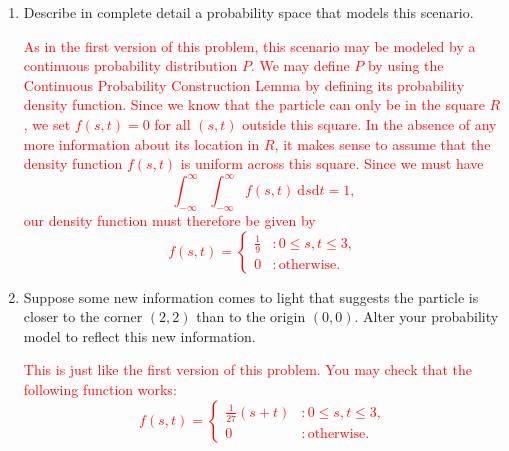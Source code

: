 \documentclass[12pt,reqno]{amsart}
\begin{document}
\medskip
\begin{enumerate}
    \item Describe in complete detail a probability space that models this scenario.

    \bigskip
    \textcolor{red}{As in the first version of this problem, this scenario may be modeled by a continuous probability distribution $P$. We may define $P$ by using the Continuous Probability Construction Lemma by defining its probability density function. Since we know that the particle can only be in the square $R$, we set $f(s,t)=0$ for all $(s,t)$ outside this square. In the absence of any more information about its location in $R$, it makes sense to assume that the density function $f(s,t)$ is uniform across this square. Since we must have
        \[\int_{-\infty}^\infty \int_{-\infty}^\infty f(s,t) \ \text{d} s \text{d}t =1,\]
    our density function must therefore be given by
        \[f(s,t) = \begin{cases} \frac{1}{9} & : 0 \leq s,t \leq 3, \\ 0 & : \text{otherwise}.\end{cases}\]}
    \bigskip

    \item Suppose some new information comes to light that suggests the particle is closer to the corner $(2,2)$ than to the origin $(0,0)$. Alter your probability model to reflect this new information.
    
    \bigskip
    \textcolor{red}{This is just like the first version of this problem. You may check that the following function works:
        \[f(s,t) = \begin{cases}
            \frac{1}{27}(s+t) & : 0 \leq s,t \leq 3, \\
            0 & : \text{otherwise}.
        \end{cases}\]}
\end{enumerate}
\end{document}
